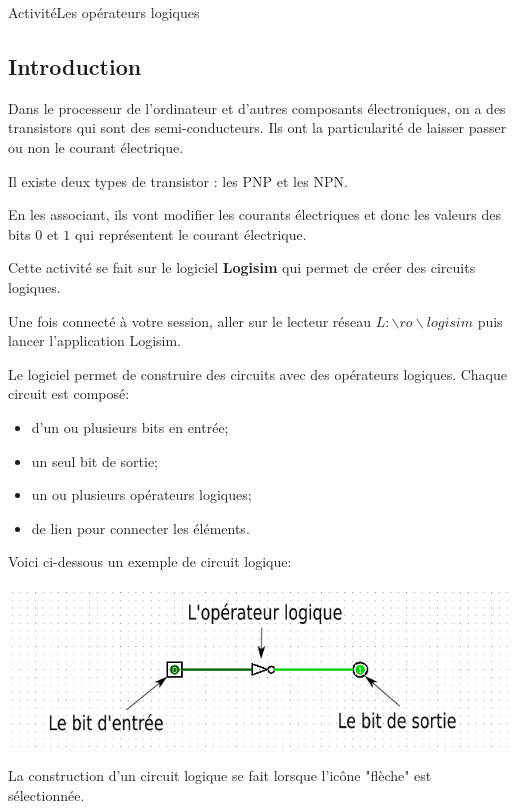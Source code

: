 \documentclass[11pt,a4paper]{article}
\begin{document}
\begin{NSI}
{Activité}{Les opérateurs logiques}
\end{NSI}


\subsection*{\Large Introduction}
Dans le processeur  de l'ordinateur et d'autres composants électroniques, on a des transistors qui sont des semi-conducteurs. Ils ont la particularité de laisser passer ou non le courant électrique. \medskip

Il existe deux types de transistor : les PNP et les NPN. \medskip

En les associant, ils vont modifier les courants électriques et donc les valeurs des bits $0$ et $1$ qui représentent le courant électrique.\medskip

Cette activité se fait sur le logiciel \textbf{Logisim} qui permet de créer des circuits logiques.

Une fois connecté à votre session, aller sur le lecteur réseau $L:\backslash ro \backslash logisim$ puis lancer l'application Logisim.\bigskip

Le logiciel permet de construire des circuits avec des opérateurs logiques. Chaque circuit est composé:
\begin{itemize}
\item d'un ou plusieurs bits en entrée;
\item un seul bit de sortie;
\item un ou plusieurs opérateurs logiques;
\item de lien pour connecter les éléments.
\end{itemize}

Voici ci-dessous un exemple de circuit logique:

\begin{center}
\includegraphics[scale=0.8]{img/presentation_element.png}
\end{center}

La construction d'un circuit logique se fait lorsque l'icône "flèche" est sélectionnée.
\end{document}
